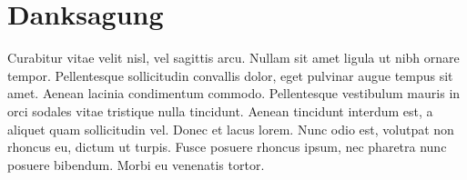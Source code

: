 \chapter{Danksagung}

  Curabitur vitae velit nisl, vel sagittis arcu. Nullam sit amet ligula ut nibh ornare tempor. Pellentesque sollicitudin convallis dolor, eget pulvinar augue tempus sit amet. Aenean lacinia condimentum commodo. Pellentesque vestibulum mauris in orci sodales vitae tristique nulla tincidunt. Aenean tincidunt interdum est, a aliquet quam sollicitudin vel. Donec et lacus lorem. Nunc odio est, volutpat non rhoncus eu, dictum ut turpis. Fusce posuere rhoncus ipsum, nec pharetra nunc posuere bibendum. Morbi eu venenatis tortor.
